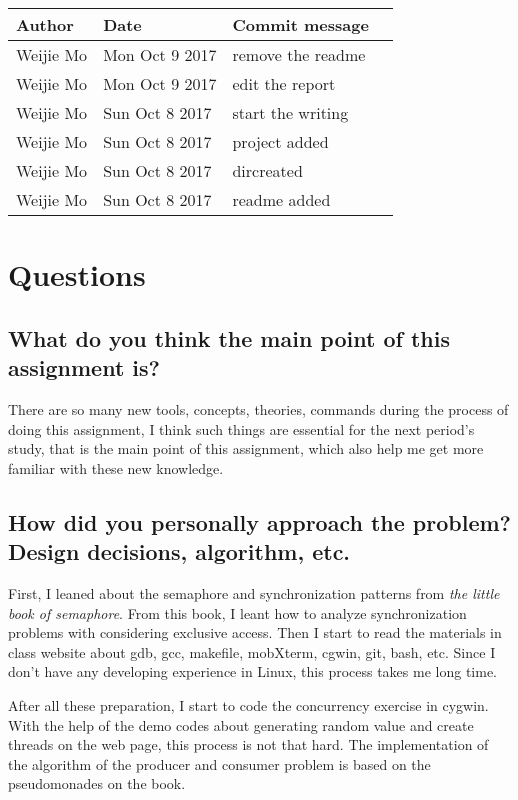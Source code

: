 \documentclass[10pt,draftclsnofoot,peerreview,letterpaper,onecolumn,]{IEEEtran}
\begin{document}
\begin{table}[h]
\centering
\begin{tabular}{|l|l|l|l|}
\hline

Author    & Date & Commit message
\\ \hline
Weijie Mo & Mon Oct 9 2017 & remove the readme
\\ \hline
Weijie Mo & Mon Oct 9 2017 & edit the report
\\ \hline
Weijie Mo & Sun Oct 8 2017 & start the writing
\\ \hline
Weijie Mo & Sun Oct 8 2017 & project added
\\ \hline
Weijie Mo & Sun Oct 8 2017 & dircreated
\\ \hline
Weijie Mo & Sun Oct 8 2017 & readme added
\\ \hline

\end{tabular}
\end{table}

\section{Questions}
\subsection{What do you think the main point of this assignment is?}
There are so many new tools, concepts, theories, commands during the process of doing this assignment, I think such things are essential for the next period’s study, that is the main point of this assignment, which also help me get more familiar with these new knowledge.

\subsection{How did you personally approach the problem? Design decisions, algorithm, etc.}
First, I leaned about the semaphore and synchronization patterns from \emph{the little book of semaphore}. From this book, I leant how to analyze synchronization problems with considering exclusive access. Then I start to read the materials in class website about gdb, gcc, makefile, mobXterm, cgwin, git, bash, etc. Since I don't have any developing experience in Linux, this process takes me long time. 

After all these preparation, I start to code the concurrency exercise in cygwin. With the help of the demo codes about generating random value and create threads on the web page, this process is not that hard. The implementation of the algorithm of the producer and consumer problem is based on the pseudomonades on the book.  
\end{document}
